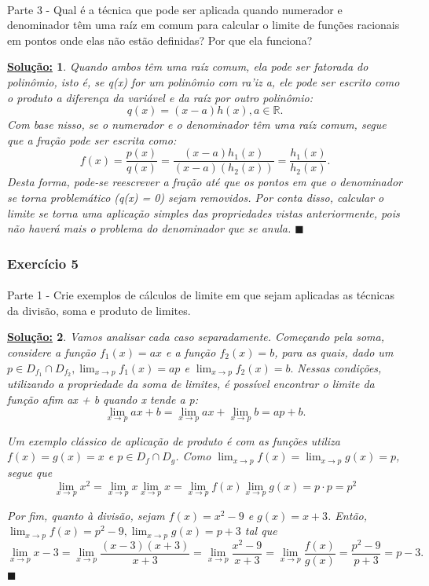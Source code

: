 \documentclass{article}
\newtheorem*{sol*}{\underline{Solu\c c\~ao:}}
\renewcommand\qedsymbol{$\blacksquare$}
\begin{document}
\paragraph{} Parte 3 - Qual \'e a t\'ecnica que pode ser aplicada quando numerador e denominador t\^em uma ra\'iz em comum para calcular o limite de fun\c c\~oes racionais em pontos onde elas n\~ao est\~ao definidas? Por que ela funciona?
\begin{sol*}
Quando ambos t\^em uma ra\'iz comum, ela pode ser fatorada do polin\^omio, isto \'e, se q(x) for um polin\^omio com ra'iz a, ele pode ser escrito como o produto a diferen\c ca da vari\'avel e da ra\'iz por outro polin\^omio:
$$
q(x) = (x - a)h(x), a\in\mathbb{R}.
$$
Com base nisso, se o numerador e o denominador t\^em uma ra\'iz comum, segue que a fra\c c\~ao pode ser escrita como:
$$
f(x) = \frac{p(x)}{q(x)} = \frac{(x-a)h_1(x)}{(x-a)(h_2(x))} = \frac{h_1(x)}{h_2(x)}.
$$
Desta forma, pode-se reescrever a fra\c c\~ao at\'e que os pontos em que o denominador se torna problem\'atico (q(x) = 0) sejam removidos. Por conta disso, calcular o limite se torna uma aplica\c c\~ao simples das propriedades vistas anteriormente, pois n\~ao haver\'a mais o problema do denominador que se anula.
\qedsymbol
\end{sol*}

\subsubsection{Exerc\'icio 5}
\paragraph{} Parte 1 - Crie exemplos de c\'alculos de limite em que sejam aplicadas as t\'ecnicas da divis\~ao, soma e produto de limites. 
\begin{sol*}
Vamos analisar cada caso separadamente. 
Come\c cando pela soma, considere a fun\c c\~ao $f_1(x) = ax$ e a fun\c c\~ao $f_2(x) = b$, para as quais, dado um $p\in{D_{f_1}}\cap{D_{f_2}}, \lim_{x\to{p}}f_1(x) = ap$ e $\lim_{x\to{p}}f_2(x) = b.$ Nessas condi\c c\~oes, utilizando a propriedade da soma de limites, \'e poss\'ivel encontrar o limite da fun\c c\~ao afim ax + b quando x tende a p:
$$
\lim_{x\to{p}}ax + b = \lim_{x\to{p}}ax + \lim_{x\to{p}}b = ap + b.
$$

Um exemplo cl\'assico de aplica\c c\~ao de produto \'e com as fun\c c\~oes utiliza $f(x) = g(x) = x$ e $p\in{D_f\cap D_g}$. Como $\lim_{x\to{p}}f(x) = \lim_{x\to{p}} g(x) = p$, segue que 
$$
\lim_{x\to{p}}x^2 = \lim_{x\to{p}}x\lim_{x\to{p}}x = \lim_{x\to{p}}f(x)\lim_{x\to{p}}g(x) = p\cdot{p} = p^2
$$

Por fim, quanto \`a divis\~ao, sejam $f(x) = x^2 - 9$ e $g(x) = x + 3$. Ent\~ao, $\lim_{x\to{p}}f(x) = p^2 - 9, \lim_{x\to{p}}g(x) = p + 3$
tal que
$$
\lim_{x\to{p}}x - 3 = \lim_{x\to{p}}\frac{(x - 3)(x + 3)}{x + 3} = \lim_{x\to{p}}\frac{x^2 - 9}{x + 3} = \lim_{x\to{p}}\frac{f(x)}{g(x)} = \frac{p^2 - 9}{p + 3} = p - 3.
$$
\qedsymbol
\end{sol*}
\end{document}
